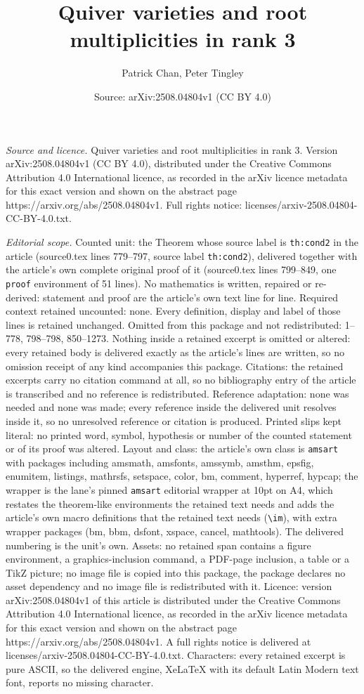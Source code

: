 \documentclass[10pt,a4paper]{amsart}
\title[Quiver varieties and root multiplicities in rank 3]{Quiver varieties and root multiplicities in rank 3}
\author{Patrick Chan, Peter Tingley}
\date{Source: arXiv:2508.04804v1 (CC BY 4.0)}
\begin{document}
\maketitle

\noindent\emph{Source and licence.} Quiver varieties and root multiplicities in rank 3. Version arXiv:2508.04804v1 (CC BY 4.0), distributed under the Creative Commons Attribution 4.0 International licence, as recorded in the arXiv licence metadata for this exact version and shown on the abstract page https://arxiv.org/abs/2508.04804v1. Full rights notice: licenses/arxiv-2508.04804-CC-BY-4.0.txt.\par\smallskip

\noindent\textit{Editorial scope.} Counted unit: the Theorem whose source label is \texttt{th:cond2} in the article (source0.tex lines 779--797, source label \texttt{th:cond2}), delivered together with the article's own complete original proof of it (source0.tex lines 799--849, one \texttt{proof} environment of 51 lines). No mathematics is written, repaired or re-derived: statement and proof are the article's own text line for line. Required context retained uncounted: none. Every definition, display and label of those lines is retained unchanged. Omitted from this package and not redistributed: 1--778, 798--798, 850--1273. Nothing inside a retained excerpt is omitted or altered: every retained body is delivered exactly as the article's lines are written, so no omission receipt of any kind accompanies this package. Citations: the retained excerpts carry no citation command at all, so no bibliography entry of the article is transcribed and no reference is redistributed. Reference adaptation: none was needed and none was made; every reference inside the delivered unit resolves inside it, so no unresolved reference or citation is produced. Printed slips kept literal: no printed word, symbol, hypothesis or number of the counted statement or of its proof was altered. Layout and class: the article's own class is \texttt{amsart} with packages including amsmath, amsfonts, amssymb, amsthm, epsfig, enumitem, listings, mathrsfs, setspace, color, bm, comment, hyperref, hypcap; the wrapper is the lane's pinned \texttt{amsart} editorial wrapper at 10pt on A4, which restates the theorem-like environments the retained text needs and adds the article's own macro definitions that the retained text needs (\texttt{\textbackslash im}), with extra wrapper packages (bm, bbm, dsfont, xspace, cancel, mathtools). The delivered numbering is the unit's own. Assets: no retained span contains a figure environment, a graphics-inclusion command, a PDF-page inclusion, a table or a TikZ picture; no image file is copied into this package, the package declares no asset dependency and no image file is redistributed with it. Licence: version arXiv:2508.04804v1 of this article is distributed under the Creative Commons Attribution 4.0 International licence, as recorded in the arXiv licence metadata for this exact version and shown on the abstract page https://arxiv.org/abs/2508.04804v1. A full rights notice is delivered at licenses/arxiv-2508.04804-CC-BY-4.0.txt. Characters: every retained excerpt is pure ASCII, so the delivered engine, XeLaTeX with its default Latin Modern text font, reports no missing character.
\end{document}
